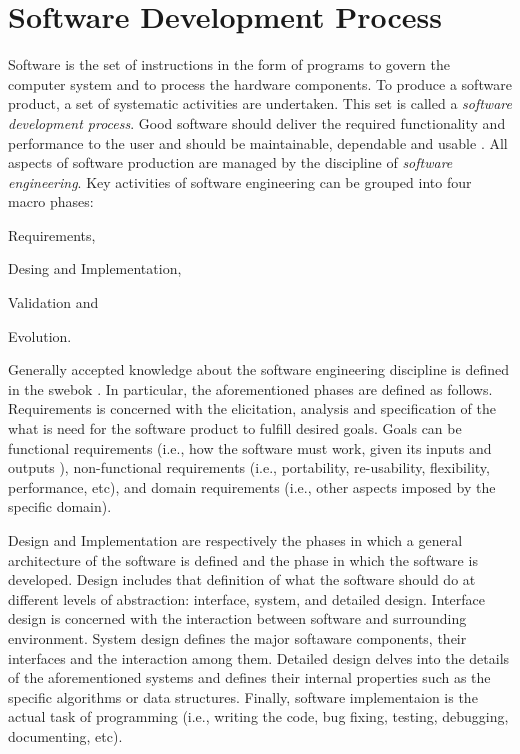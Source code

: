 \section{Software Development Process}
\label{sec:software-development}


Software is the set of instructions in the form of programs to govern the computer system and to process the hardware components. To produce a software product, a set of systematic activities are undertaken. This set is called a \emph{software development process}. 
Good software should deliver the required functionality and performance to the user and should be maintainable, dependable and usable \citep{sommerville2011software}. All aspects of software production are managed by the discipline of \emph{software engineering}. 
Key activities of software engineering can be grouped into four macro phases: 
\begin{inparaenum}[\itshape i)]
	\item Requirements, 
	\item Desing and Implementation, 
	\item Validation and 
	\item Evolution. 
\end{inparaenum}


Generally accepted knowledge about the software engineering discipline is defined in the \gls{swebok} \citep{borque2014guide}. In particular, the aforementioned phases are defined as follows. 
Requirements is concerned with the elicitation, analysis and specification of the what is need for the software product to fulfill desired goals. Goals can be functional requirements (i.e., how the software must work, given its inputs and outputs ),  non-functional requirements (i.e., portability, re-usability, flexibility, performance, etc), and domain requirements (i.e., other aspects imposed by the specific domain).

Design and Implementation are respectively the phases in which a general architecture of the software is defined and the phase in which the software is developed. Design includes that definition of what the software should do at different levels of abstraction: interface, system, and detailed design. Interface design is concerned with the interaction between software and surrounding environment. System design defines the major softaware components, their interfaces and the interaction among them. Detailed design delves into the details of the aforementioned systems and defines their internal properties such as the specific algorithms or data structures. Finally, software implementaion is the actual task of programming (i.e., writing the code, bug fixing, testing, debugging, documenting, etc).

